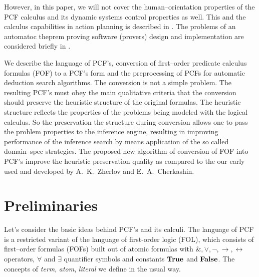 \documentclass[a4paper,12pt]{article}
\begin{document}
However, in this paper, we will not cover the human--orientation properties of the PCF calculus and its dynamic systems control properties as well.  This and the calculus capabilities in action planning is described in \cite{ICDS2000}.  The problems of an automatoc theprem proving software (provers) design and implementation are considered briefly in \cite{mipro2013}.

We describe the language of PCF's, conversion of first--order predicate calculus formulas (FOF) to a PCF's form and the preprocessing of PCFs for automatic deduction search algorithms.  The conversion is not a simple problem.  The resulting PCF's must obey the main qualitative criteria that the conversion should preserve the heuristic structure of the original formulas.  The heuristic structure reflects the properties of the problems being modeled with the logical calculus.  So the preservation the structure during conversion allows one to pass the problem properties to the inference engine, resulting in improving performance of the inference search by means application of the so called domain--spec strategies.  The proposed new algorithm of conversion of FOF into PCF's improve the heuristic preservation quality as compared to the our early used \cite{mipro2013} and developed by A.~K.~Zherlov and E.~A.~Cherkashin.




\section{Preliminaries}

Let's consider the basic ideas behind PCF's and its calculi.  The language of PCF is a restricted variant of the language of first-order logic (FOL), which consists of first--order formulas (FOFs) built out of atomic formulas with $\&, \vee, \neg, \rightarrow, \leftrightarrow$ operators, $\forall$ and $\exists$ quantifier symbols and constants $\text{\textbf{True}}$ and $\text{\textbf{False}}$.  The concepts of \emph{term}, \emph{atom}, \emph{literal} we define in the usual way.
\end{document}
